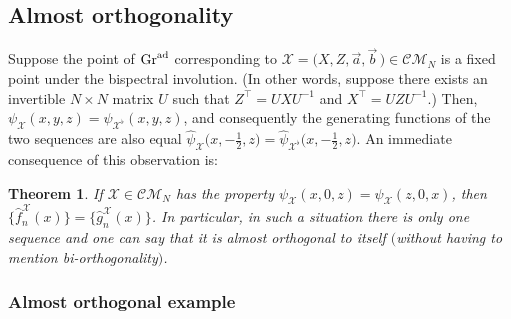 \documentclass[pdftex]{sigma}
\numberwithin{equation}{section}
\newtheorem{Theorem}{Theorem}[section]
\theoremstyle{definition}
\def\X{\mathcal{X}}
\def\CM{\mathcal{C\!M}}
\def\ff{\hat f}
\def\gg{\hat g}
\begin{document}
\subsection{Almost orthogonality}
Suppose the point of ${\rm Gr}^{\rm ad}$ corresponding to $\X=\bigl(X,Z,\vec a,\vec
b\,\bigr)\in\CM_N$
is a fixed point under the bispectral involution. (In
other words, suppose there exists an invertible $N\times N$ matrix $U$
such that $Z^{\top}=UXU^{-1}$ and $X^{\top}=UZU^{-1}$.)
Then,
$\psi_{\X}(x,y,z)=\psi_{\X^\flat}(x,y,z)$, and consequently the
generating functions of the two sequences are also equal
$
\hat\psi_{\X}\bigl(x,-\tfrac{1}{2},z\bigr)=\hat\psi_{\X^\flat}\bigl(x,-\tfrac{1}{2},z\bigr)$.
An immediate consequence of this observation is:

\begin{Theorem}\label{thm:almostorthog}
 If $\X\in\CM_N$
 has the property $\psi_{\X}(x,0,z)=\psi_{\X}(z,0,x)$,
 then $\big\{\ff_n^{\X}(x)\big\}=\big\{\gg_n^{\X}(x)\big\}$. In particular, in such a
 situation there is only one sequence and one can say that it is
 almost orthogonal to itself $($without having to mention \textit{bi}-orthogonality$)$.
\end{Theorem}

\subsubsection{Almost orthogonal example}\label{subsec:almostorthogexamp}
\end{document}
